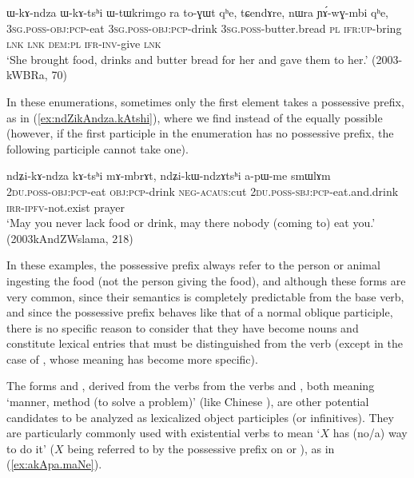 \begin{exe}
\ex \label{ex:WkAndza.WkAtshi}
\gll  ɯ-kɤ-ndza ɯ-kɤ-tsʰi ɯ-tɯkrimgo ra to-ɣɯt qʰe, tɕendɤre, nɯra ɲɤ́-wɣ-mbi qʰe, \\
\textsc{3sg}.\textsc{poss}-\textsc{obj}:\textsc{pcp}-eat \textsc{3sg}.\textsc{poss}-\textsc{obj}:\textsc{pcp}-drink \textsc{3sg}.\textsc{poss}-butter.bread \textsc{pl} \textsc{ifr}:\textsc{up}-bring \textsc{lnk} \textsc{lnk} \textsc{dem}:\textsc{pl} \textsc{ifr}-\textsc{inv}-give \textsc{lnk} \\
 \glt  `She brought food, drinks and butter bread for her and gave them to her.' (2003-kWBRa, 70)
\end{exe}

In these enumerations, sometimes only the first element takes a possessive prefix, as in (\ref{ex:ndZikAndza.kAtshi}), where we find  instead of the equally possible  (however, if the first  participle in the enumeration has no possessive prefix, the following participle cannot take one).

\begin{exe}
\ex \label{ex:ndZikAndza.kAtshi}
\gll  ndʑi-kɤ-ndza kɤ-tsʰi mɤ-mbrɤt, ndʑi-kɯ-ndzɤtsʰi a-pɯ-me smɯlɤm \\
\textsc{2du}.\textsc{poss}-\textsc{obj}:\textsc{pcp}-eat \textsc{obj}:\textsc{pcp}-drink \textsc{neg}-\textsc{acaus}:cut  \textsc{2du}.\textsc{poss}-\textsc{sbj}:\textsc{pcp}-eat.and.drink \textsc{irr}-\textsc{ipfv}-not.exist prayer \\
\glt `May you never lack food or drink, may there nobody (coming to) eat you.' (2003kAndZWslama, 218)
\end{exe}

In these examples, the possessive prefix always refer to the person or animal ingesting the food (not the person giving the food), and although these forms are very common, since their semantics is completely predictable from the base verb, and since the possessive prefix behaves like that of a normal oblique participle, there is no specific reason to consider that they have become nouns and constitute lexical entries that must be distinguished from the verb (except in the case of , whose meaning has become more specific).

The forms  and , derived from the verbs from the verbs  and , both meaning `manner, method (to solve a problem)' (like Chinese ), are other potential candidates to be analyzed as lexicalized object participles (or infinitives).  They are particularly commonly used with existential verbs to mean `$X$ has (no/a) way to do it' ($X$ being referred to by the possessive prefix on  or ), as in (\ref{ex:akApa.maNe}).

